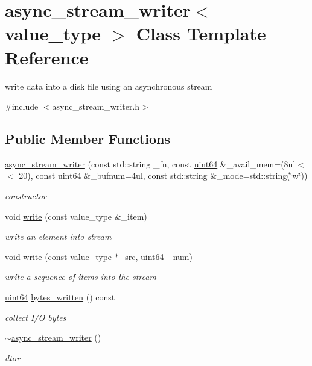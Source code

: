 \hypertarget{classasync__stream__writer}{}\section{async\+\_\+stream\+\_\+writer$<$ value\+\_\+type $>$ Class Template Reference}
\label{classasync__stream__writer}


write data into a disk file using an asynchronous stream  




{\ttfamily \#include $<$async\+\_\+stream\+\_\+writer.\+h$>$}

\subsection*{Public Member Functions}
\begin{DoxyCompactItemize}
\item 
\hyperlink{classasync__stream__writer_a11b5cdf01df7a627d00c6e77be165702}{async\+\_\+stream\+\_\+writer} (const std\+::string \+\_\+fn, const \hyperlink{types_8h_a60e8696a4678cd348e991a1f172e53f7}{uint64} \&\+\_\+avail\+\_\+mem=(8ul$<$$<$ 20), const uint64 \&\+\_\+bufnum=4ul, const std\+::string \&\+\_\+mode=std\+::string(\char`\"{}w\char`\"{}))
\begin{DoxyCompactList}\small\item\em constructor \end{DoxyCompactList}\item 
void \hyperlink{classasync__stream__writer_afb36228f86866b4eb65343fd313754cc}{write} (const value\+\_\+type \&\+\_\+item)
\begin{DoxyCompactList}\small\item\em write an element into stream \end{DoxyCompactList}\item 
void \hyperlink{classasync__stream__writer_a95a073a12efffbb4d0f1417abef06ab3}{write} (const value\+\_\+type $\ast$\+\_\+src, \hyperlink{types_8h_a60e8696a4678cd348e991a1f172e53f7}{uint64} \+\_\+num)
\begin{DoxyCompactList}\small\item\em write a sequence of items into the stream \end{DoxyCompactList}\item 
\hyperlink{types_8h_a60e8696a4678cd348e991a1f172e53f7}{uint64} \hyperlink{classasync__stream__writer_a6fd98bbc41adf1cd51468ee490608d6e}{bytes\+\_\+written} () const
\begin{DoxyCompactList}\small\item\em collect I/O bytes \end{DoxyCompactList}\item 
\hyperlink{classasync__stream__writer_ac001ff454b249e4f71b4f92755017334}{$\sim$async\+\_\+stream\+\_\+writer} ()
\begin{DoxyCompactList}\small\item\em dtor \end{DoxyCompactList}\end{DoxyCompactItemize}
